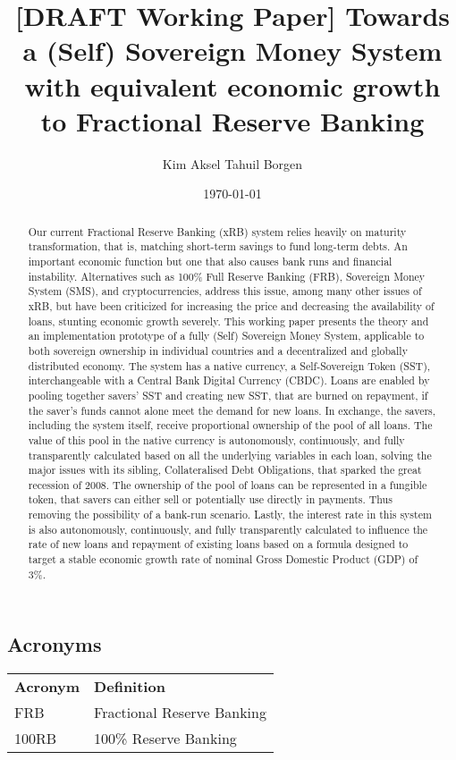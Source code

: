 \documentclass{article}
\title{[DRAFT Working Paper] Towards a (Self) Sovereign Money System with equivalent economic growth to Fractional Reserve Banking}
\author{Kim Aksel Tahuil Borgen}
\date{\today}
\begin{document}
\maketitle
\begin{abstract}
    Our current Fractional Reserve Banking (xRB) system relies heavily on maturity transformation, that is, matching short-term savings to fund long-term debts. An important economic function but one that also causes bank runs and financial instability. Alternatives such as 100\% Full Reserve Banking (FRB), Sovereign Money System (SMS), and cryptocurrencies, address this issue, among many other issues of xRB, but have been criticized for increasing the price and decreasing the availability of loans, stunting economic growth severely. This working paper presents the theory and an implementation prototype of a fully (Self) Sovereign Money System, applicable to both sovereign ownership in individual countries and a decentralized and globally distributed economy. The system has a native currency, a Self-Sovereign Token (SST), interchangeable with a Central Bank Digital Currency (CBDC). Loans are enabled by pooling together savers' SST and creating new SST, that are burned on repayment, if the saver's funds cannot alone meet the demand for new loans. In exchange, the savers, including the system itself, receive proportional ownership of the pool of all loans. The value of this pool in the native currency is autonomously, continuously, and fully transparently calculated based on all the underlying variables in each loan, solving the major issues with its sibling, Collateralised Debt Obligations, that sparked the great recession of 2008. The ownership of the pool of loans can be represented in a fungible token, that savers can either sell or potentially use directly in payments. Thus removing the possibility of a bank-run scenario. Lastly, the interest rate in this system is also autonomously, continuously, and fully transparently calculated to influence the rate of new loans and repayment of existing loans based on a formula designed to target a stable economic growth rate of nominal Gross Domestic Product (GDP) of 3\%.  
\end{abstract}

\subsection{Acronyms}

\begin{tabular}{ll}
\textbf{Acronym} & \textbf{Definition} \\
FRB & Fractional Reserve Banking \\
100RB & 100\% Reserve Banking \\
\end{tabular}





\printbibliography
\end{document}

